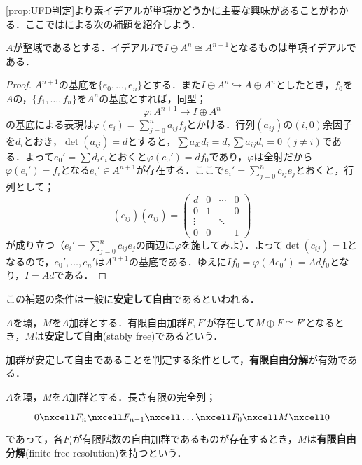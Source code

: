 \ref{prop:UFD判定}より素イデアルが単項かどうかに主要な興味があることがわかる．ここでは\cite{narita}による次の補題を紹介しよう．

\begin{lem}
	$A$が整域であるとする．イデアル$I$で$I\oplus A^n\cong A^{n+1}$となるものは単項イデアルである．
\end{lem}

\begin{proof}
	$A^{n+1}$の基底を$\{e_0,\dots,e_n\}$とする．また$I\oplus A^n\hookrightarrow A\oplus A^{n}$としたとき，$f_0$を$A$の，$\{f_1,\dots,f_n\}$を$A^n$の基底とすれば，同型；
	\[\varphi:A^{n+1}\to I\oplus A^n\]
	の基底による表現は$\varphi(e_i)=\sum_{j=0}^n a_{ij}f_j$とかける．行列$(a_{ij})$の$(i,0)$余因子を$d_i$とおき，$\det (a_{ij})=d$とすると，$\sum a_{i0}d_i=d,\sum a_{ij}d_i=0~(j\neq i)$である．よって$e_0'=\sum d_ie_i$とおくと$\varphi(e_0')=df_0$であり，$\varphi$は全射だから$\varphi(e_i')=f_i$となる$e_i'\in A^{n+1}$が存在する．ここで$e_i'=\sum_{j=0}^n c_{ij}e_j$とおくと，行列として；
	\[(c_{ij})(a_{ij})=
		\begin{pmatrix}
			d&0&\cdots&0\\
			0&1&&0\\
			\vdots&&\ddots\\
			0&0&&1
	\end{pmatrix}\]
	が成り立つ（$e_i'=\sum_{j=0}^n c_{ij}e_j$の両辺に$\varphi$を施してみよ）．よって$\det (c_{ij})=1$となるので，$e_0',\dots,e_n'$は$A^{n+1}$の基底である．ゆえに$If_0=\varphi(Ae_0')=Ad f_0$となり，$I=Ad$である．
\end{proof}
この補題の条件は一般に\textbf{安定して自由}であるといわれる．

\begin{defi}[安定して自由]
	$A$を環，$M$を$A$加群とする．有限自由加群$F,F'$が存在して$M\oplus F\cong F'$となるとき，$M$は\textbf{安定して自由}(stably free)であるという．
\end{defi}

加群が安定して自由であることを判定する条件として，\textbf{有限自由分解}が有効である．
\begin{defi}[有限自由分解]
	$A$を環，$M$を$A$加群とする．長さ有限の完全列；
	\[\begin{tikzcd}
		0\nxcell F_n\nxcell F_{n-1}\nxcell\dots\nxcell F_0\nxcell M\nxcell 0
	\end{tikzcd}\]
	であって，各$F_i$が有限階数の自由加群であるものが存在するとき，$M$は\textbf{有限自由分解}(finite free resolution)を持つという．
\end{defi}

